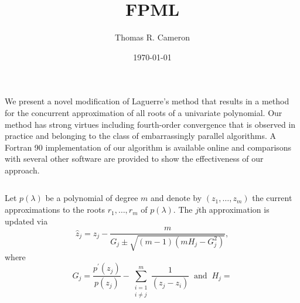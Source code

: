 \documentclass[orientation=portrait]{tikzposter}
\title{FPML}
\author{Thomas R. Cameron}
\date{\today}
\institute{Davidson College}
\begin{document}
 
\maketitle

{
We present a novel modification of Laguerre's method that results in a method for the concurrent approximation of all roots of a univariate polynomial. Our method has strong virtues including fourth-order convergence that is observed in practice and belonging to the class of embarrassingly parallel algorithms. A Fortran 90 implementation of our algorithm is available online and comparisons with several other software are provided to show the effectiveness of our approach.
}

\begin{columns}
	{
		Let $p(\lambda)$ be a polynomial of degree $m$ and denote by $(z_{1},\ldots,z_{m})$ the current approximations to the roots $r_{1},\ldots,r_{m}$ of $p(\lambda)$. The $j$th approximation is updated via
		\begin{equation}
		\hat{z}_{j}=z_{j}-\frac{m}{G_{j}\pm\sqrt{(m-1)(mH_{j}-G_{j}^{2})}},
		\end{equation}
		where 
		\begin{equation}
		G_{j}=\frac{p^{'}(z_{j})}{p(z_{j})}-\sum_{\substack{i=1\\i\neq j}}^{m}\frac{1}{(z_{j}-z_{i})}~\text{ and }~H_{j}=
		\end{equation}
	}
	
\end{columns}
 
\end{document}
